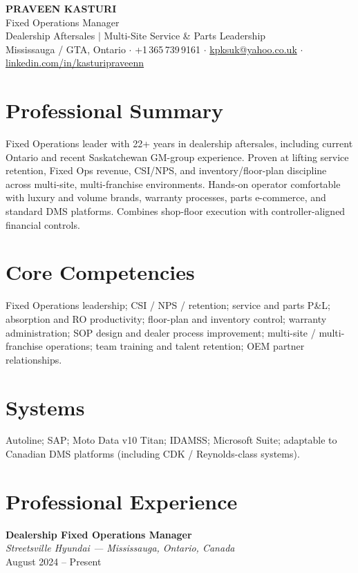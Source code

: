 \documentclass[11pt,letterpaper]{article}
\newcommand{\role}[3]{%
  \textbf{\color{accent}#1}\\[-0.1em]
  \textit{#2}\\[-0.15em]
  {#3}\par\vspace{0.25em}
}
\begin{document}
\begin{center}
  {\LARGE\bfseries\color{accent} PRAVEEN KASTURI}\\[0.25em]
  {\large Fixed Operations Manager}\\[0.15em]
  {\normalsize Dealership Aftersales $\mid$ Multi-Site Service \& Parts Leadership}\\[0.55em]
  \small
  Mississauga / GTA, Ontario
  $\cdot$
  +1\,365\,739\,9161
  $\cdot$
  \href{mailto:kpksuk@yahoo.co.uk}{kpksuk@yahoo.co.uk}
  $\cdot$
  \href{https://www.linkedin.com/in/kasturipraveenn/}{linkedin.com/in/kasturipraveenn}
\end{center}

\section{Professional Summary}
Fixed Operations leader with 22+ years in dealership aftersales, including current Ontario and recent Saskatchewan GM-group experience. Proven at lifting service retention, Fixed Ops revenue, CSI/NPS, and inventory/floor-plan discipline across multi-site, multi-franchise environments. Hands-on operator comfortable with luxury and volume brands, warranty processes, parts e-commerce, and standard DMS platforms. Combines shop-floor execution with controller-aligned financial controls.

\section{Core Competencies}
Fixed Operations leadership; CSI / NPS / retention; service and parts P\&L; absorption and RO productivity; floor-plan and inventory control; warranty administration; SOP design and dealer process improvement; multi-site / multi-franchise operations; team training and talent retention; OEM partner relationships.

\section{Systems}
Autoline; SAP; Moto Data v10 Titan; IDAMSS; Microsoft Suite; adaptable to Canadian DMS platforms (including CDK / Reynolds-class systems).

\section{Professional Experience}

\role
  {Dealership Fixed Operations Manager}
  {Streetsville Hyundai --- Mississauga, Ontario, Canada}
  {August 2024 -- Present}
\end{document}
